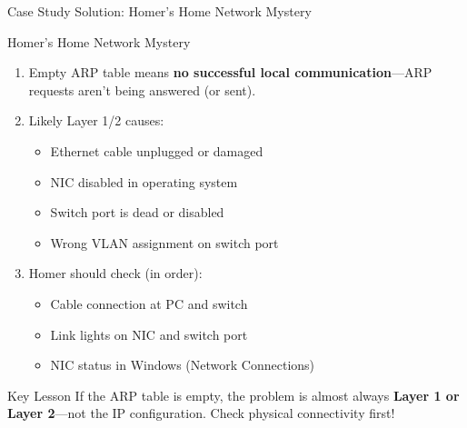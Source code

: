 \documentclass[aspectratio=169]{beamer}  %
\begin{document}
\begin{frame}{Case Study Solution: Homer's Home Network Mystery}
    \begin{casesolution}{Homer's Home Network Mystery}
        \begin{enumerate}
            \item Empty ARP table means \textbf{no successful local communication}---ARP requests aren't being answered (or sent).
            \item Likely Layer 1/2 causes:
                \begin{itemize}
                    \scriptsize
                    \item Ethernet cable unplugged or damaged
                    \item NIC disabled in operating system
                    \item Switch port is dead or disabled
                    \item Wrong VLAN assignment on switch port
                \end{itemize}
            \item Homer should check (in order):
                \begin{itemize}
                    \scriptsize
                    \item Cable connection at PC and switch
                    \item Link lights on NIC and switch port
                    \item NIC status in Windows (Network Connections)
                \end{itemize}
        \end{enumerate}
    \end{casesolution}
    
    \vspace{0.3em}
    \begin{alertblock}{Key Lesson}
        \scriptsize
        If the ARP table is empty, the problem is almost always \textbf{Layer 1 or Layer 2}---not the IP configuration. Check physical connectivity first!
    \end{alertblock}
\end{frame}

\end{document}
